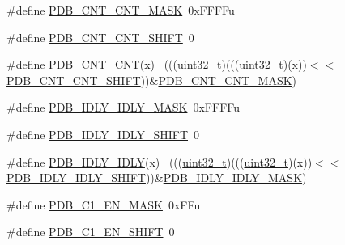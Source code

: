 \begin{DoxyCompactItemize}
\item 
\#define \hyperlink{group___p_d_b___register___masks_ga2c5797892b612935a1eb7ba29ea0d202}{P\+D\+B\+\_\+\+C\+N\+T\+\_\+\+C\+N\+T\+\_\+\+M\+A\+SK}~0x\+F\+F\+F\+Fu
\item 
\#define \hyperlink{group___p_d_b___register___masks_ga684fc86038c1a05d2ba14aa872e551a6}{P\+D\+B\+\_\+\+C\+N\+T\+\_\+\+C\+N\+T\+\_\+\+S\+H\+I\+FT}~0
\item 
\#define \hyperlink{group___p_d_b___register___masks_gaba80630566123d5cf67862a5b024af87}{P\+D\+B\+\_\+\+C\+N\+T\+\_\+\+C\+NT}(x)                                                  ~(((\hyperlink{_p_e___types_8h_a33594304e786b158f3fb30289278f5af}{uint32\+\_\+t})(((\hyperlink{_p_e___types_8h_a33594304e786b158f3fb30289278f5af}{uint32\+\_\+t})(x))$<$$<$\hyperlink{group___p_d_b___register___masks_ga684fc86038c1a05d2ba14aa872e551a6}{P\+D\+B\+\_\+\+C\+N\+T\+\_\+\+C\+N\+T\+\_\+\+S\+H\+I\+FT}))\&\hyperlink{group___p_d_b___register___masks_ga2c5797892b612935a1eb7ba29ea0d202}{P\+D\+B\+\_\+\+C\+N\+T\+\_\+\+C\+N\+T\+\_\+\+M\+A\+SK})
\item 
\#define \hyperlink{group___p_d_b___register___masks_gaa3a9995da0b93a73827d556de3a7f8ec}{P\+D\+B\+\_\+\+I\+D\+L\+Y\+\_\+\+I\+D\+L\+Y\+\_\+\+M\+A\+SK}~0x\+F\+F\+F\+Fu
\item 
\#define \hyperlink{group___p_d_b___register___masks_ga7ce7e734267097f79a8fd2036dc25271}{P\+D\+B\+\_\+\+I\+D\+L\+Y\+\_\+\+I\+D\+L\+Y\+\_\+\+S\+H\+I\+FT}~0
\item 
\#define \hyperlink{group___p_d_b___register___masks_ga07fbca50ea650a4ca32f51bf89ff3732}{P\+D\+B\+\_\+\+I\+D\+L\+Y\+\_\+\+I\+D\+LY}(x)                                              ~(((\hyperlink{_p_e___types_8h_a33594304e786b158f3fb30289278f5af}{uint32\+\_\+t})(((\hyperlink{_p_e___types_8h_a33594304e786b158f3fb30289278f5af}{uint32\+\_\+t})(x))$<$$<$\hyperlink{group___p_d_b___register___masks_ga7ce7e734267097f79a8fd2036dc25271}{P\+D\+B\+\_\+\+I\+D\+L\+Y\+\_\+\+I\+D\+L\+Y\+\_\+\+S\+H\+I\+FT}))\&\hyperlink{group___p_d_b___register___masks_gaa3a9995da0b93a73827d556de3a7f8ec}{P\+D\+B\+\_\+\+I\+D\+L\+Y\+\_\+\+I\+D\+L\+Y\+\_\+\+M\+A\+SK})
\item 
\#define \hyperlink{group___p_d_b___register___masks_ga318b4eb1bb609120bed14b19c91ef0c1}{P\+D\+B\+\_\+\+C1\+\_\+\+E\+N\+\_\+\+M\+A\+SK}~0x\+F\+Fu
\item 
\#define \hyperlink{group___p_d_b___register___masks_ga99bd07d734f0e46a718933179b61402b}{P\+D\+B\+\_\+\+C1\+\_\+\+E\+N\+\_\+\+S\+H\+I\+FT}~0
\item 

\end{DoxyCompactItemize}
